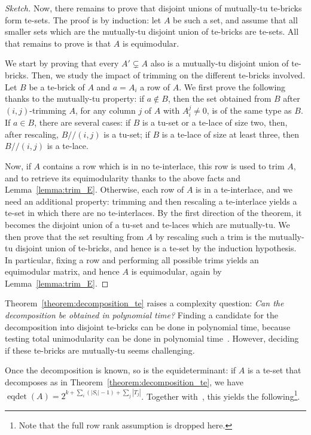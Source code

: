 \documentclass[11pt,a4paper]{amsart}
\theoremstyle{plain}
\theoremstyle{definition}
\DeclareMathOperator{\eqdet}{eqdet}
\newcommand{\trim}{/\!\!/}
\begin{document}
\begin{proof}[Sketch]
	\medskip
	
	Now, there remains to prove that disjoint unions of mutually-tu te-bricks form te-sets.
	The proof is by induction: let $A$ be such a set, and assume that all smaller sets which are the mutually-tu disjoint union of te-bricks are te-sets.
	All that remains to prove is that $A$ is equimodular.
	
	We start by proving that every $A'\subsetneq A$ also is a mutually-tu disjoint union of te-bricks.
	Then, we study the impact of trimming on the different te-bricks involved.
	Let $B$ be a te-brick of $A$ and $a=A_i$ a row of $A$. 
	We first prove the following thanks to the mutually-tu property: if $a\notin B$, then the set obtained from $B$ after $(i,j)$-trimming $A$, for any column $j$ of $A$ with $A_i^j\neq0$, is of the same type as $B$.
	If $a\in B$, there are several cases: if $B$ is a tu-set or a te-lace of size two, then, after rescaling, $B\trim (i,j)$ is a tu-set; if $B$ is a te-lace of size at least three, then $B\trim (i,j)$ is a te-lace.
	
	Now, if $A$ contains a row which is in no te-interlace, this row is used to trim $A$, and to retrieve its equimodularity thanks to the above facts and Lemma~\ref{lemma:trim_E}.
	Otherwise, each row of $A$ is in a te-interlace, and we need an additional property: trimming and then rescaling a te-interlace yields a te-set in which there are no te-interlaces.
	By the first direction of the theorem, it becomes the disjoint union of a tu-set and te-laces which are mutually-tu.
	We then prove that the set resulting from $A$ by rescaling such a trim is the mutually-tu disjoint union of te-bricks, and hence is a te-set by the induction hypothesis.
	In particular, fixing a row and performing all possible trims yields an equimodular matrix, and hence $A$ is equimodular, again by Lemma~\ref{lemma:trim_E}.
	\end{proof}


Theorem~\ref{theorem:decomposition_te} raises a complexity question: {\em Can the decomposition be obtained in polynomial time?}
Finding a candidate for the decomposition into disjoint te-bricks can be done in polynomial time, because testing total unimodularity can be done in polynomial time~\cite{Seymour1980}.
However, deciding if these te-bricks are mutually-tu seems challenging.

Once the decomposition is known, so is the equideterminant:
if $A$ is a te-set that decomposes as in Theorem~\ref{theorem:decomposition_te}, we have $\eqdet(A) = 2^{k+\sum_i (|S_i|-1) +\sum_j |T_j|}$.
Together with~\cite[{Theorem~1.7}]{Abdi2024}, this yields the following\footnote{Note that the full row rank assumption is dropped here.}.
\end{document}

